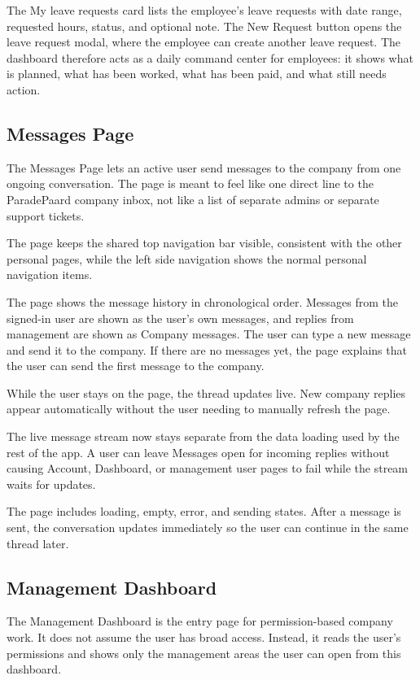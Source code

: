 \documentclass[11pt]{article}
\begin{document}
The My leave requests card lists the employee's leave requests with date range, requested hours, status, and optional note. The New Request button opens the leave request modal, where the employee can create another leave request. The dashboard therefore acts as a daily command center for employees: it shows what is planned, what has been worked, what has been paid, and what still needs action.

\subsection{Messages Page}

The Messages Page lets an active user send messages to the company from one ongoing conversation. The page is meant to feel like one direct line to the ParadePaard company inbox, not like a list of separate admins or separate support tickets.

The page keeps the shared top navigation bar visible, consistent with the other personal pages, while the left side navigation shows the normal personal navigation items.

The page shows the message history in chronological order. Messages from the signed-in user are shown as the user's own messages, and replies from management are shown as Company messages. The user can type a new message and send it to the company. If there are no messages yet, the page explains that the user can send the first message to the company.

While the user stays on the page, the thread updates live. New company replies appear automatically without the user needing to manually refresh the page.

The live message stream now stays separate from the data loading used by the rest of the app. A user can leave Messages open for incoming replies without causing Account, Dashboard, or management user pages to fail while the stream waits for updates.

The page includes loading, empty, error, and sending states. After a message is sent, the conversation updates immediately so the user can continue in the same thread later.

\subsection{Management Dashboard}

The Management Dashboard is the entry page for permission-based company work. It does not assume the user has broad access. Instead, it reads the user's permissions and shows only the management areas the user can open from this dashboard.
\end{document}
